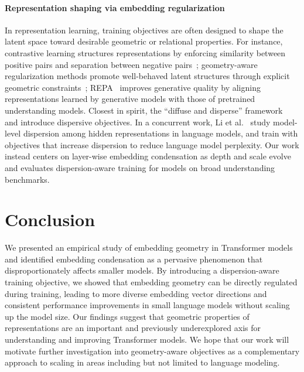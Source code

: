 \documentclass{article}
\theoremstyle{plain}
\theoremstyle{definition}
\theoremstyle{remark}
\begin{document}
\paragraph{Representation shaping via embedding regularization}
In representation learning, training objectives are often designed to shape the latent space toward desirable geometric or relational properties. For instance, contrastive learning structures representations by enforcing similarity between positive pairs and separation between negative pairs~\cite{oord2018representation, chen2020simple, liu2024cuts, sun2025geometry, he2019momentum, chen2020improved, liu2025diffkillr, liu2025imageflownet, givechian2025immunostruct}; geometry-aware regularization methods promote well-behaved latent structures through explicit geometric constraints~\cite{wang2020understanding, liao2025rnagenscape, sun2024geometry, verma2018manifold}; REPA~\cite{yu2024representation} improves generative quality by aligning representations learned by generative models with those of pretrained understanding models. Closest in spirit, the ``diffuse and disperse'' framework~\cite{diffuse_and_disperse} and \citet{tokarchuk2025keep} introduce dispersive objectives. In a concurrent work, Li et al.~\cite{li2026predictive} study model-level dispersion among hidden representations in language models, and train with objectives that increase dispersion to reduce language model perplexity. Our work instead centers on layer-wise embedding condensation as depth and scale evolve and evaluates dispersion-aware training for models on broad understanding benchmarks.

\vspace{-6pt}
\section{Conclusion}
We presented an empirical study of embedding geometry in Transformer models and identified embedding condensation as a pervasive phenomenon that disproportionately affects smaller models. By introducing a dispersion-aware training objective, we showed that embedding geometry can be directly regulated during training, leading to more diverse embedding vector directions and consistent performance improvements in small language models without scaling up the model size. Our findings suggest that geometric properties of representations are an important and previously underexplored axis for understanding and improving Transformer models. We hope that our work will motivate further investigation into geometry-aware objectives as a complementary approach to scaling in areas including but not limited to language modeling.
\end{document}
